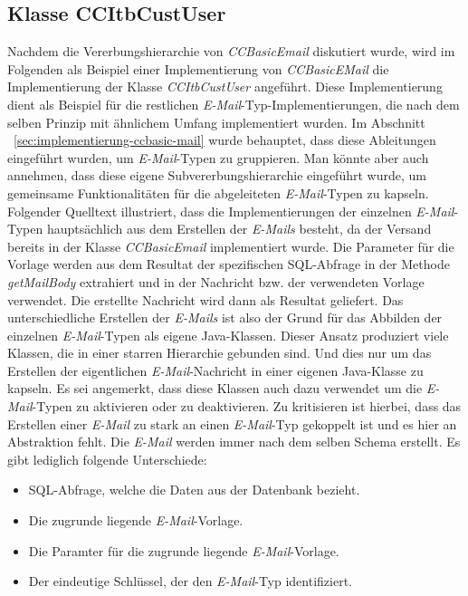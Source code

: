 \subsection{Klasse CCItbCustUser}
Nachdem die Vererbungshierarchie von \emph{CCBasicEmail} diskutiert wurde, wird im Folgenden als Beispiel einer Implementierung von \emph{CCBasicEMail} die Implementierung der Klasse \emph{CCItbCustUser} angeführt. Diese Implementierung dient als Beispiel für die restlichen \emph{E-Mail}-Typ-Implementierungen, die nach dem selben Prinzip mit ähnlichem Umfang implementiert wurden. Im Abschnitt ~\ref{sec:implementierung-ccbasic-mail} wurde behauptet, dass diese Ableitungen eingeführt wurden, um \emph{E-Mail}-Typen zu gruppieren. Man könnte aber auch annehmen, dass diese eigene Subvererbungshierarchie eingeführt wurde, um gemeinsame Funktionalitäten für die abgeleiteten \emph{E-Mail}-Typen zu kapseln. 
\newline
\newline
Folgender Quelltext illustriert, dass die Implementierungen der einzelnen \emph{E-Mail}-Typen hauptsächlich aus dem Erstellen der \emph{E-Mails} besteht, da der Versand bereits in der Klasse \emph{CCBasicEmail} implementiert wurde. Die Parameter für die Vorlage werden aus dem Resultat der spezifischen SQL-Abfrage in der Methode \emph{getMailBody} extrahiert und in der Nachricht bzw. der verwendeten Vorlage verwendet. Die erstellte Nachricht wird dann als Resultat geliefert. Das unterschiedliche Erstellen der \emph{E-Mails} ist also der Grund für das Abbilden der einzelnen \emph{E-Mail}-Typen als eigene Java-Klassen. Dieser Ansatz produziert viele Klassen, die in einer starren Hierarchie gebunden sind. Und dies nur um das Erstellen der eigentlichen \emph{E-Mail}-Nachricht in einer eigenen Java-Klasse zu kapseln. Es sei angemerkt, dass diese Klassen auch dazu verwendet um die \emph{E-Mail}-Typen zu aktivieren oder zu deaktivieren. Zu kritisieren ist hierbei, dass das Erstellen einer \emph{E-Mail} zu stark an einen \emph{E-Mail}-Typ gekoppelt ist und es hier an Abstraktion fehlt. Die \emph{E-Mail} werden immer nach dem selben Schema erstellt. Es gibt lediglich folgende Unterschiede:
\begin{itemize}
	\item SQL-Abfrage, welche die Daten aus der Datenbank bezieht.
	\item Die zugrunde liegende \emph{E-Mail}-Vorlage.
	\item Die Paramter für die zugrunde liegende \emph{E-Mail}-Vorlage.
	\item Der eindeutige Schlüssel, der den \emph{E-Mail}-Typ identifiziert.
\end{itemize}
